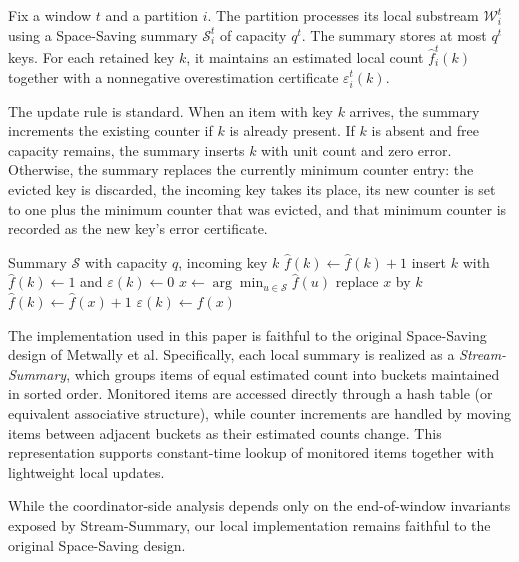 \documentclass[sigconf, nonacm]{acmart}
\begin{document}
Fix a window \(t\) and a partition \(i\). The partition processes its local substream \(\mathcal W_i^t\) using a Space-Saving summary \(\mathcal{S}_i^t\) of capacity \(q^t\). The summary stores at most \(q^t\) keys. For each retained key \(k\), it maintains an estimated local count \(\hat f_i^t(k)\) together with a nonnegative overestimation certificate \(\varepsilon_i^t(k)\).

The update rule is standard. When an item with key \(k\) arrives, the summary increments the existing counter if \(k\) is already present. If \(k\) is absent and free capacity remains, the summary inserts \(k\) with unit count and zero error. Otherwise, the summary replaces the currently minimum counter entry: the evicted key is discarded, the incoming key takes its place, its new counter is set to one plus the minimum counter that was evicted, and that minimum counter is recorded as the new key's error certificate.

\begin{algorithm}[t]
\caption{Space-Saving update at partition \(i\)}
\label{alg:ss-update}
\small
\begin{algorithmic}[1]
\Require Summary \(\mathcal{S}\) with capacity \(q\), incoming key \(k\)
    \State \(\hat f(k) \gets \hat f(k)+1\)
    \State insert \(k\) with \(\hat f(k)\gets 1\) and \(\varepsilon(k)\gets 0\)
\Else
    \State \(x \gets \arg\min_{u \in \mathcal{S}} \hat f(u)\)
    \State replace \(x\) by \(k\)
    \State \(\hat f(k)\gets \hat f(x)+1\)
    \State \(\varepsilon(k)\gets \hat f(x)\)
\EndIf
\end{algorithmic}
\end{algorithm}

The implementation used in this paper is faithful to the original Space-Saving design of Metwally et al. Specifically, each local summary is realized as a \emph{Stream-Summary}, which groups items of equal estimated count into buckets maintained in sorted order. Monitored items are accessed directly through a hash table (or equivalent associative structure), while counter increments are handled by moving items between adjacent buckets as their estimated counts change. This representation supports constant-time lookup of monitored items together with lightweight local updates.

While the coordinator-side analysis depends only on the end-of-window invariants exposed by Stream-Summary, our local implementation remains faithful to the original Space-Saving design.
\end{document}
